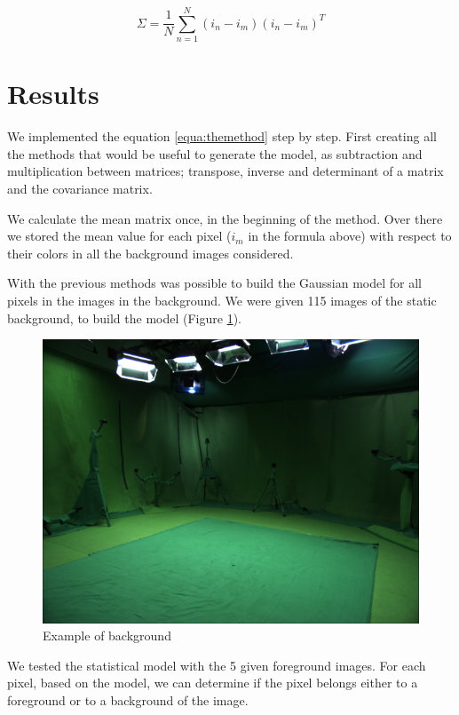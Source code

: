 \documentclass{article}
\begin{document}
\begin{equation}
	\Sigma = \frac{1}{N}\sum_{n=1}^{N}({i_n}-{i_m})({i_n}-{i_m})^T
\end{equation}


\section{Results}
We implemented the equation \ref{equa:themethod} step by step. First creating all the methods that would be useful to generate the model, as subtraction and multiplication between matrices; transpose, inverse and determinant of a matrix and the covariance matrix.

We calculate the mean matrix once, in the beginning of the method. Over there we stored the mean value for each pixel (\textit{$i_m$} in the formula above) with respect to their colors in all the background images considered.

With the previous methods was possible to build the Gaussian model for all pixels in the images in the background. We were given 115 images of the static background, to build the model (Figure \ref{background}).

	\begin{figure} [H]
		\centering
		\includegraphics[scale=0.3]{img/img_000000}
		\caption{Example of background\label{background}}
	\end{figure}

	We tested the statistical model with the 5 given foreground images. For each pixel, based on the model, we can determine if the pixel belongs either to a foreground or to a background of the image.
\end{document}
